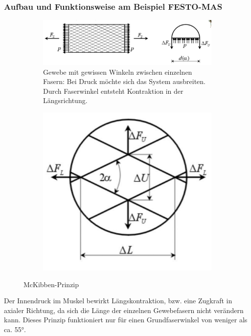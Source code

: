 \subsubsection{Aufbau und Funktionsweise am Beispiel FESTO-MAS}
\begin{figure}[h!]
	\centering
	\begin{subfigure}{.6\textwidth}
		\includegraphics[width=\linewidth]{figures/ch03_mckibben1.png}
		\caption{Gewebe mit gewissen Winkeln zwischen einzelnen Fasern: Bei Druck möchte sich das System ausbreiten. Durch Faserwinkel entsteht Kontraktion in der Längsrichtung.}
	\end{subfigure}
	\begin{subfigure}{.3\textwidth}
		\includegraphics[width=\linewidth]{figures/ch03_mckibben.png}
		\caption{}
	\end{subfigure}
	\caption{McKibben-Prinzip}
	\label{mck}
\end{figure}
\noindent
Der Innendruck im Muskel bewirkt Längskontraktion, bzw. eine Zugkraft in axialer Richtung, da sich die Länge der einzelnen Gewebefasern nicht verändern kann. Dieses Prinzip funktioniert nur für einen Grundfaserwinkel von weniger als ca. 55°.\\

